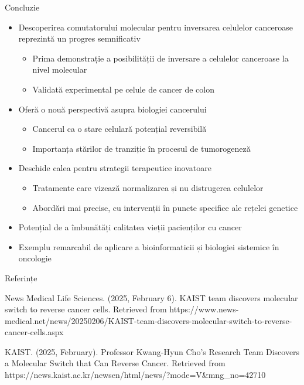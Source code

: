 \documentclass{beamer}
\begin{document}
	
	\begin{frame}{Concluzie}
		\begin{itemize}
			\item Descoperirea comutatorului molecular pentru inversarea celulelor canceroase reprezintă un progres semnificativ
			\begin{itemize}
				\item Prima demonstrație a posibilității de inversare a celulelor canceroase la nivel molecular
				\item Validată experimental pe celule de cancer de colon
			\end{itemize}
			\item Oferă o nouă perspectivă asupra biologiei cancerului
			\begin{itemize}
				\item Cancerul ca o stare celulară potențial reversibilă
				\item Importanța stărilor de tranziție în procesul de tumorogeneză
			\end{itemize}
			\item Deschide calea pentru strategii terapeutice inovatoare
			\begin{itemize}
				\item Tratamente care vizează normalizarea și nu distrugerea celulelor
				\item Abordări mai precise, cu intervenții în puncte specifice ale rețelei genetice
			\end{itemize}
			\item Potențial de a îmbunătăți calitatea vieții pacienților cu cancer
			\item Exemplu remarcabil de aplicare a bioinformaticii și biologiei sistemice în oncologie
		\end{itemize}
	\end{frame}
	
	\begin{frame}{Referințe}
		\begin{thebibliography}{9}
			News Medical Life Sciences. (2025, February 6). 
			\newblock KAIST team discovers molecular switch to reverse cancer cells. 
			\newblock Retrieved from https://www.news-medical.net/news/20250206/KAIST-team-discovers-molecular-switch-to-reverse-cancer-cells.aspx
			
			KAIST. (2025, February). 
			\newblock Professor Kwang-Hyun Cho's Research Team Discovers a Molecular Switch that Can Reverse Cancer. 
			\newblock Retrieved from https://news.kaist.ac.kr/newsen/html/news/?mode=V\&mng\_no=42710
		\end{thebibliography}
	\end{frame}
	
\end{document}
